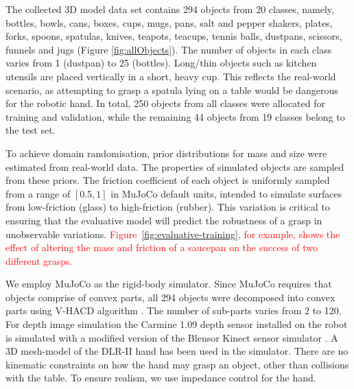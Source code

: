 The collected 3D model data set contains 294 objects from 20 classes, namely, bottles, bowls, cans, boxes, cups, mugs, pans, salt and pepper shakers, plates, forks, spoons, spatulas, knives, teapots, teacups, tennis balls, dustpans, scissors, funnels and jugs (Figure \ref{fig:allObjects}). The number of objects in each class varies from 1 (dustpan) to 25 (bottles). Long/thin objects such as kitchen utensils are placed vertically in a short, heavy cup. This reflects the real-world scenario, as attempting to grasp a spatula lying on a table would be dangerous for the robotic hand. In total, 250 objects from all classes were allocated for training and validation, while the remaining 44 objects from 19 classes belong to the test set.

To achieve domain randomisation, prior distributions for mass and size were estimated from real-world data. The properties of simulated objects are sampled from these priors. The friction coefficient of each object is uniformly sampled from a range of $[0.5, 1]$ in MuJoCo default units, intended to simulate surfaces from low-friction (glass) to high-friction (rubber). This variation is critical to ensuring that the evaluative model will predict the robustness of a grasp in unobservable variations. \textcolor{red}{Figure~\ref{fig:evaluative-training}, for example, shows the effect of altering the mass and friction of a saucepan on the success of two different grasps.}


We employ MuJoCo \cite{MuJoCo} as the rigid-body simulator. Since MuJoCo requires that objects comprise of convex parts, all 294 objects were decomposed into convex parts using V-HACD algorithm \cite{V-HACD}. The number of sub-parts varies from 2 to 120. For depth image simulation the Carmine 1.09 depth sensor installed on the robot is simulated with a modified version of the Blensor Kinect sensor simulator \cite{KinectSimulator}. A 3D mesh-model of the DLR-II hand has been used in the simulator. There are no kinematic constraints on how the hand may grasp an object, other than collisions with the table. To ensure realism, we use impedance control for the hand.



